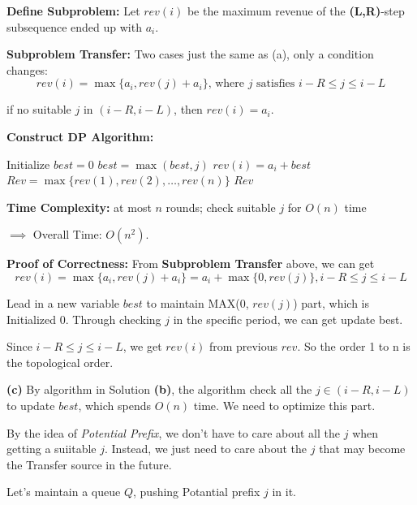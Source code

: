 \documentclass[11pt]{article}
\begin{document}
\qquad \textbf{Define Subproblem:} Let $rev(i)$ be the maximum revenue of the \textbf{(L,R)}-step subsequence ended up with $a_i$.

\qquad \textbf{Subproblem Transfer: } Two cases just the same as (a), only a condition changes: 
\[rev(i) = \max\{a_i, rev(j) + a_i\} \text{, where } j \text{ satisfies } i-R \le j \le i-L\]

\qquad if no suitable $j$ in $(i-R, i-L)$, then $rev(i)=a_i$. 

\qquad \textbf{Construct DP Algorithm: }
\begin{algorithm}
\caption{Find the maximum (L,R)-step subsequence}
\begin{algorithmic}[1] %
    \State Initialize $best = 0 $
        \State $best = \max (best, j)$ 
    \EndFor
    \State $rev(i) = a_i + best$
\EndFor
\State $Rev = \max \{rev(1), rev(2), \dots, rev(n)\}$
\State \Return $Rev$
\end{algorithmic}
\end{algorithm}

\qquad \textbf{Time Complexity: } at most $n$ rounds; check suitable $j$ for $O(n)$ time

\qquad $\implies$ Overall Time: $O(n^2)$. 

\qquad \textbf{Proof of Correctness: } From \textbf{Subproblem Transfer} above, we can get 
\[rev(i) = \max\{a_i, rev(j) + a_i\} = a_i + \max \{0, rev(j)\}, i-R \le j \le i-L\]

\qquad Lead in a new variable $best$ to maintain MAX(0, $rev(j)$) part, which is Initialized 0. Through checking $j$ in the specific period, 
we can get update best. 

\qquad Since $i-R \le j \le i-L$, we get $rev(i)$ from previous $rev$. So the order 
1 to n is the topological order. 

\qquad 

\textbf{(c)} By algorithm in Solution \textbf{(b)}, the algorithm check all the $j \in (i-R, i-L)$ to update $best$, which spends $O(n)$ time. 
We need to optimize this part. 

\qquad By the idea of \textit{Potential Prefix}, we don't have to care about all the $j$ when getting a suiitable $j$. 
Instead, we just need to care about the $j$ that may become the Transfer source in the future. 

\qquad Let's maintain a queue $Q$, pushing Potantial prefix $j$ in it. 
\end{document}
